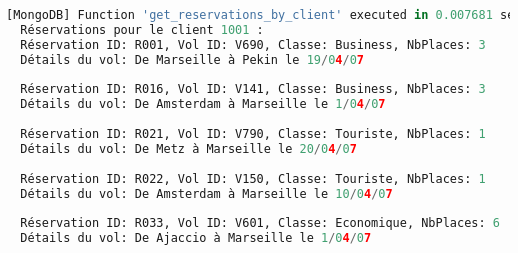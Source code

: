 \begin{lstlisting}[language=Python, caption=Résultats des requêtes, label=lst:results_queries]
  [MongoDB] Function 'get_reservations_by_client' executed in 0.007681 seconds
  Réservations pour le client 1001 :
  Réservation ID: R001, Vol ID: V690, Classe: Business, NbPlaces: 3
  Détails du vol: De Marseille à Pekin le 19/04/07
  
  Réservation ID: R016, Vol ID: V141, Classe: Business, NbPlaces: 3
  Détails du vol: De Amsterdam à Marseille le 1/04/07
  
  Réservation ID: R021, Vol ID: V790, Classe: Touriste, NbPlaces: 1
  Détails du vol: De Metz à Marseille le 20/04/07
  
  Réservation ID: R022, Vol ID: V150, Classe: Touriste, NbPlaces: 1
  Détails du vol: De Amsterdam à Marseille le 10/04/07
  
  Réservation ID: R033, Vol ID: V601, Classe: Economique, NbPlaces: 6
  Détails du vol: De Ajaccio à Marseille le 1/04/07
  

\end{lstlisting}
